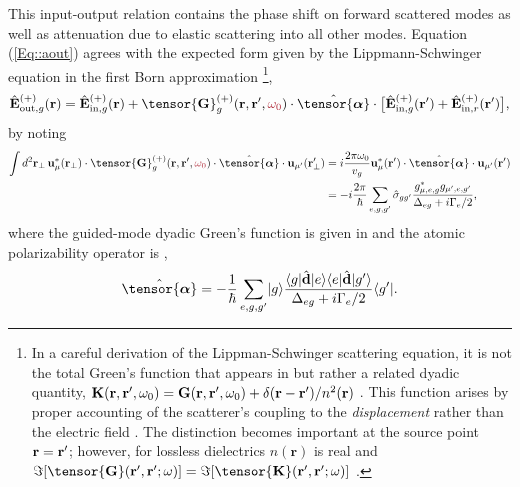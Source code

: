 \documentclass[preprint,aps,pra,onecolumn]{revtex4-1} %
\newcommand{\inp}{{\rm in}}
\newcommand{\out}{{\rm out}}
\newcommand{\poltens}{\hat{\tensor{\boldsymbol{\alpha}}}}
\newcommand{\comment}[1]{{\color{Maroon} #1}}
\begin{document}
This input-output relation contains the phase shift on forward scattered modes as well as attenuation due to elastic scattering into all other modes.
Equation (\ref{Eq::aout}) agrees with the expected form given by the Lippmann-Schwinger equation in the first Born approximation \footnote{In a careful derivation of the Lippman-Schwinger scattering equation, it is not the total Green's function that appears in  but rather a related dyadic quantity, $\mathbf{K}(\mathbf{r},\mathbf{r}', \omega_0) = \mathbf{G}(\mathbf{r},\mathbf{r}', \omega_0) + \delta(\mathbf{r}-\mathbf{r}')/n^2(\mathbf{r})$ \cite{wubs_multiple-scattering_2004}. This function arises by proper accounting of the scatterer's coupling to the \emph{displacement} rather than the electric field \cite{yao_ultrahigh_2009}.  The distinction becomes important at the source point $\mathbf{r} = \mathbf{r}'$; however, for lossless dielectrics $n(\mathbf{r})$ is real and $\Im[\tensor{\mathbf{G}}(\br',\br'; \omega)] = \Im[\tensor{\mathbf{K}}(\br',\br'; \omega)]$ \cite{yao_-chip_2010}. },
	\begin{equation} \label{Eq::IOScatteredField}
		\hat{\mathbf{E}}^{(+)}_{\out,g}(\br)=\hat{\mathbf{E}}^{(+)}_{ \inp, g}(\br)+\tensor{\mathbf{G}}_g^{(+)}(\br,\br',\comment{\omega_0})\cdot \poltens \cdot \big[\hat{\mathbf{E}}^{(+)}_{\inp, g}(\br')+\hat{\mathbf{E}}^{(+)}_{\inp,r}(\br') \big],
	\end{equation}
by noting
	\begin{align}
		\int d^2 \mbf{r}_\perp \, \mathbf{u}^*_{\mu} (\br_\perp)\cdot \tensor{\mathbf{G}}_g^{(+)}(\br,\br',\comment{\omega_0})\cdot \poltens \cdot \mathbf{u}_{\mu'} (\br'_\perp) &= i \frac{ 2\pi \omega_0}{v_g} \mathbf{u}^*_\mu (\br') \cdot \poltens \cdot \mathbf{u}_{\mu'} (\br') \\
		& = - i \frac{2 \pi}{\hbar} \sum_{e,g,g'}  \hat{\sigma}_{gg'} \frac{g_{\mu,e,g}^* g_{\mu',e,g'}}{ \Delta_{eg} + i \Gamma_{e}/2 }, 
	\end{align}
where the guided-mode dyadic Green's function is given in  and the atomic polarizability operator is \cite{buhmann_casimir-polder_2004, deutsch_quantum_2010,kien_dynamical_2013},
	\begin{equation} \label{Eq::PolarizabilityOperator}
		\poltens = - \frac{1}{\hbar} \sum_{e,g,g'}\ket{g}\frac{\bra{g}\hat{\mathbf{d}}\ket{e}\bra{e} 
\hat{\mathbf{d}}\ket{g'}}{\Delta_{eg} + i \Gamma_{e}/2 }\bra{g'}.
	\end{equation}	
\end{document}
